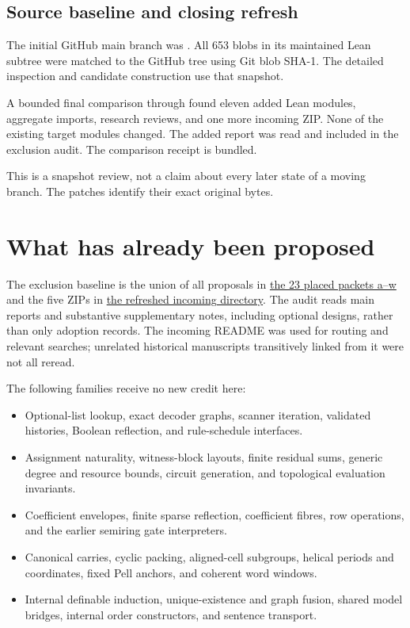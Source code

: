 \subsection{Source baseline and closing refresh}

The initial GitHub main branch was
\href{\repo/commit/89226e3921bce3e8949fadd12d3efb6914c7630c}{}.
All 653 blobs in its maintained Lean subtree were matched to the GitHub tree
using Git blob SHA-1. The detailed inspection and candidate construction use
that snapshot.

A bounded final comparison through
\href{\repo/commit/7df43cdfacb490cd3ca3acd23e39027efebf8801}{}
found eleven added Lean modules, aggregate imports, research reviews, and
one more incoming ZIP. None of the existing target modules changed.
The added report was read and included in the exclusion audit.
The comparison receipt is bundled.

This is a snapshot review, not a claim about every later state of a moving
branch. The patches identify their exact original bytes.

\section{What has already been proposed}

The exclusion baseline is the union of all proposals in
\href{\repo/tree/\pin/Computability/DiophantineConsistency/research/lean-proof-simplification}
{the 23 placed packets a--w} and the five ZIPs in
\href{\repo/tree/\pin/docs/incoming}{the refreshed incoming directory}.
The audit reads main reports and substantive supplementary notes, including
optional designs, rather than only adoption records. The incoming README
was used for routing and relevant searches; unrelated historical manuscripts
transitively linked from it were not all reread.

The following families receive no new credit here:

\begin{itemize}
\item Optional-list lookup, exact decoder graphs, scanner iteration,
validated histories, Boolean reflection, and rule-schedule interfaces.
\item Assignment naturality, witness-block layouts, finite residual sums,
generic degree and resource bounds, circuit generation, and topological
evaluation invariants.
\item Coefficient envelopes, finite sparse reflection, coefficient fibres,
row operations, and the earlier semiring gate interpreters.
\item Canonical carries, cyclic packing, aligned-cell subgroups, helical
periods and coordinates, fixed Pell anchors, and coherent word windows.
\item Internal definable induction, unique-existence and graph fusion,
shared model bridges, internal order constructors, and sentence transport.
\end{itemize}

